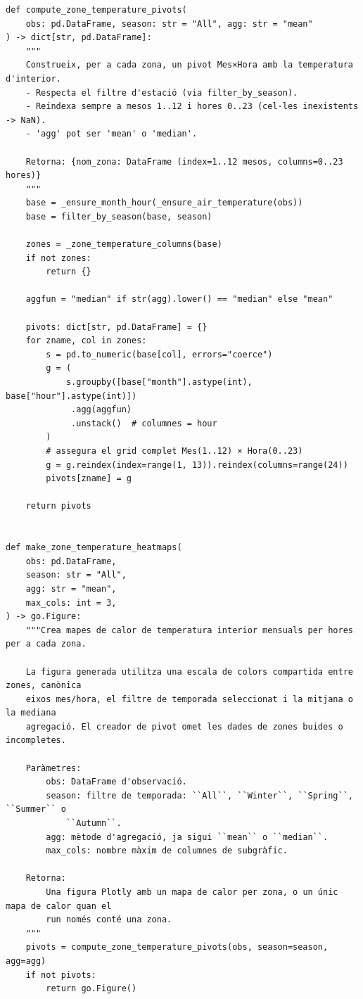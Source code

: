 \documentclass[10pt,a4paper]{article}
\begin{document}
\begin{lstlisting}[style=studioPython,caption={backend/grafics/heatmaps.py},label={lst:backend-grafics-heatmaps-py}]
def compute_zone_temperature_pivots(
    obs: pd.DataFrame, season: str = "All", agg: str = "mean"
) -> dict[str, pd.DataFrame]:
    """
    Construeix, per a cada zona, un pivot Mes×Hora amb la temperatura d'interior.
    - Respecta el filtre d'estació (via filter_by_season).
    - Reindexa sempre a mesos 1..12 i hores 0..23 (cel·les inexistents -> NaN).
    - 'agg' pot ser 'mean' o 'median'.

    Retorna: {nom_zona: DataFrame (index=1..12 mesos, columns=0..23 hores)}
    """
    base = _ensure_month_hour(_ensure_air_temperature(obs))
    base = filter_by_season(base, season)

    zones = _zone_temperature_columns(base)
    if not zones:
        return {}

    aggfun = "median" if str(agg).lower() == "median" else "mean"

    pivots: dict[str, pd.DataFrame] = {}
    for zname, col in zones:
        s = pd.to_numeric(base[col], errors="coerce")
        g = (
            s.groupby([base["month"].astype(int), base["hour"].astype(int)])
             .agg(aggfun)
             .unstack()  # columnes = hour
        )
        # assegura el grid complet Mes(1..12) × Hora(0..23)
        g = g.reindex(index=range(1, 13)).reindex(columns=range(24))
        pivots[zname] = g

    return pivots


def make_zone_temperature_heatmaps(
    obs: pd.DataFrame,
    season: str = "All",
    agg: str = "mean",
    max_cols: int = 3,
) -> go.Figure:
    """Crea mapes de calor de temperatura interior mensuals per hores per a cada zona.

    La figura generada utilitza una escala de colors compartida entre zones, canònica
    eixos mes/hora, el filtre de temporada seleccionat i la mitjana o la mediana
    agregació. El creador de pivot omet les dades de zones buides o incompletes.

    Paràmetres:
        obs: DataFrame d'observació.
        season: filtre de temporada: ``All``, ``Winter``, ``Spring``, ``Summer`` o
            ``Autumn``.
        agg: mètode d'agregació, ja sigui ``mean`` o ``median``.
        max_cols: nombre màxim de columnes de subgràfic.

    Retorna:
        Una figura Plotly amb un mapa de calor per zona, o un únic mapa de calor quan el
        run només conté una zona.
    """
    pivots = compute_zone_temperature_pivots(obs, season=season, agg=agg)
    if not pivots:
        return go.Figure()


\end{lstlisting}
\end{document}
